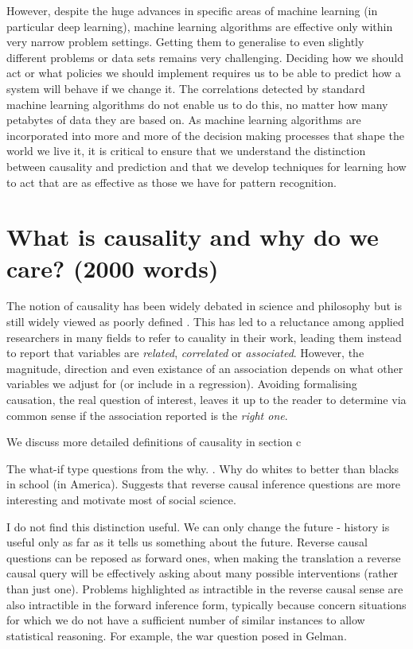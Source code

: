 \documentclass[11pt,a4paper,oneside]{book}
\theoremstyle{plain}
\theoremstyle{definition}
\begin{document}
However, despite the huge advances in specific areas of machine learning (in particular deep learning), machine learning algorithms are effective only within very narrow problem settings. Getting them to generalise to even slightly different problems or data sets remains very challenging. Deciding how we should act or what policies we should implement requires us to be able to predict how a system will behave if we change it. The correlations detected by standard machine learning algorithms do not enable us to do this, no matter how many petabytes of data they are based on. As machine learning algorithms are incorporated into more and more of the decision making processes that shape the world we live it, it is critical to ensure that we understand the distinction between causality and prediction and that we develop techniques for learning how to act that are as effective as those we have for pattern recognition.


\section{What is causality and why do we care? (2000 words)}

The notion of causality has been widely debated in science and philosophy \cite{} but is still widely viewed as poorly defined \cite{}. This has led to a reluctance among applied researchers in many fields to refer to cauality in their work, leading them instead to report that variables are \textit{related}, \textit{correlated} or \textit{associated}. However, the magnitude, direction and even existance of an association depends on what other variables we adjust for (or include in a regression). Avoiding formalising causation, the real question of interest, leaves it up to the reader to determine via common sense if the association reported is the \emph{right one}. 

We discuss more detailed definitions of causality in section c


The what-if type questions from the why. \cite{Gelman2010} \cite{}. Why do whites to better than blacks in school (in America). Suggests that reverse causal inference questions are more interesting and motivate most of social science. 

I do not find this distinction useful. 
We can only change the future - history is useful only as far as it tells us something about the future.
Reverse causal questions can be reposed as forward ones, when making the translation a reverse causal query will be effectively asking about many possible interventions (rather than just one). Problems highlighted as intractible in the reverse causal sense are also intractible in the forward inference form, typically because concern situations for which we do not have a sufficient number of similar instances to allow statistical reasoning. For example, the war question posed in Gelman. 
\end{document}
